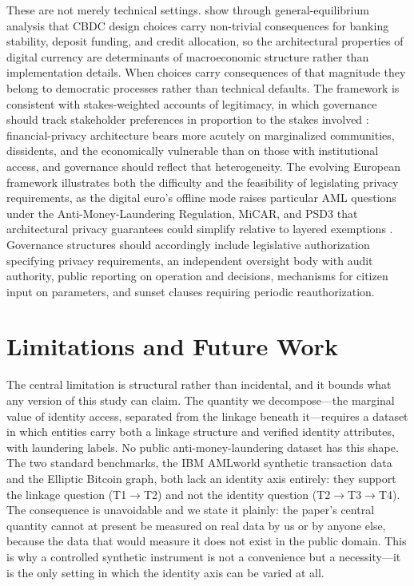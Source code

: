 \documentclass[11pt]{article}
\begin{document}
These are not merely technical settings. \citet{KeisterSanches2023} show through general-equilibrium
analysis that CBDC design choices carry non-trivial consequences for banking stability, deposit
funding, and credit allocation, so the architectural properties of digital currency are determinants
of macroeconomic structure rather than implementation details. When choices carry consequences of
that magnitude they belong to democratic processes rather than technical defaults. The framework is
consistent with stakes-weighted accounts of legitimacy, in which governance should track stakeholder
preferences in proportion to the stakes involved \citep{farzulla2025consensual}: financial-privacy
architecture bears more acutely on marginalized communities, dissidents, and the economically
vulnerable than on those with institutional access, and governance should reflect that heterogeneity.
The evolving European framework illustrates both the difficulty and the feasibility of legislating
privacy requirements, as the digital euro's offline mode raises particular AML questions under the
Anti-Money-Laundering Regulation, MiCAR, and PSD3 that architectural privacy guarantees could
simplify relative to layered exemptions \citep{Minto2024}. Governance structures should accordingly
include legislative authorization specifying privacy requirements, an independent oversight body with
audit authority, public reporting on operation and decisions, mechanisms for citizen input on
parameters, and sunset clauses requiring periodic reauthorization.
\section{Limitations and Future Work}
\label{sec:limitations}

The central limitation is structural rather than incidental, and it bounds what any version of this
study can claim. The quantity we decompose---the marginal value of identity access, separated from
the linkage beneath it---requires a dataset in which entities carry both a linkage structure and
verified identity attributes, with laundering labels. No public anti-money-laundering dataset has
this shape. The two standard benchmarks, the IBM AMLworld synthetic transaction data and the
Elliptic Bitcoin graph, both lack an identity axis entirely: they support the linkage question
(T1$\to$T2) and not the identity question (T2$\to$T3$\to$T4). The consequence is unavoidable and we
state it plainly: the paper's central quantity cannot at present be measured on real data by us or by
anyone else, because the data that would measure it does not exist in the public domain. This is why
a controlled synthetic instrument is not a convenience but a necessity---it is the only setting in
which the identity axis can be varied at all.
\end{document}
